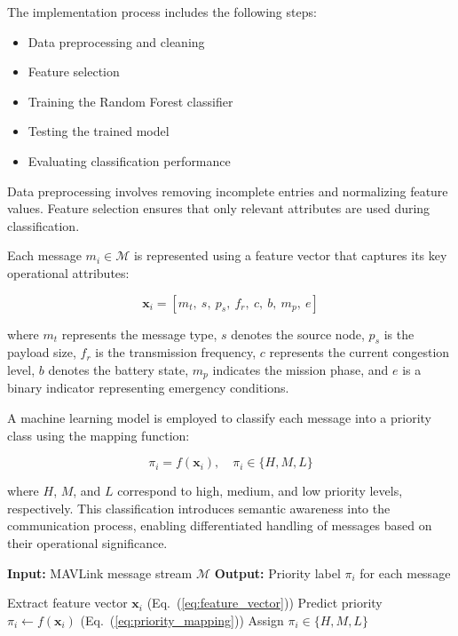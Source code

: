 The implementation process includes the following steps:

\begin{itemize}
\item Data preprocessing and cleaning
\item Feature selection
\item Training the Random Forest classifier
\item Testing the trained model
\item Evaluating classification performance
\end{itemize}

Data preprocessing involves removing incomplete entries and 
normalizing feature values. Feature selection ensures that only 
relevant attributes are used during classification.

Each message $m_i \in \mathcal{M}$ is represented using a 
feature vector that captures its key operational attributes:

\begin{equation}
\mathbf{x}_i = [m_t,\ s,\ p_s,\ f_r,\ c,\ b,\ m_p,\ e]
\label{eq:feature_vector}
\end{equation}

where $m_t$ represents the message type, $s$ denotes the source 
node, $p_s$ is the payload size, $f_r$ is the transmission 
frequency, $c$ represents the current congestion level, $b$ 
denotes the battery state, $m_p$ indicates the mission phase, 
and $e$ is a binary indicator representing emergency conditions.

A machine learning model is employed to classify each message 
into a priority class using the mapping function:

\begin{equation}
\pi_i = f(\mathbf{x}_i), \quad \pi_i \in \{H, M, L\}
\label{eq:priority_mapping}
\end{equation}

where $H$, $M$, and $L$ correspond to high, medium, and low 
priority levels, respectively. This classification introduces 
semantic awareness into the communication process, enabling 
differentiated handling of messages based on their operational 
significance.

\begin{algorithm}[H]
\caption{Machine Learning-Based Message Priority Classification}
\begin{algorithmic}[1]
\State \textbf{Input:} MAVLink message stream $\mathcal{M}$
\State \textbf{Output:} Priority label $\pi_i$ for each message

    \State Extract feature vector $\mathbf{x}_i$ (Eq.~(\ref{eq:feature_vector}))
    \State Predict priority $\pi_i \leftarrow f(\mathbf{x}_i)$ (Eq.~(\ref{eq:priority_mapping}))
    \State Assign $\pi_i \in \{H, M, L\}$
\EndFor

\end{algorithmic}
\end{algorithm}

